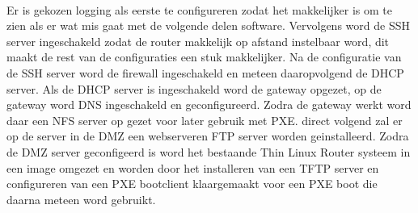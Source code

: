\documentclass[12pt]{article}
\begin{document}
\paragraph{}
Er is gekozen logging als eerste te configureren zodat het makkelijker is om te zien als er wat mis gaat met de volgende delen software. Vervolgens word de SSH server ingeschakeld zodat de router makkelijk op afstand instelbaar word, dit maakt de rest van de configuraties een stuk makkelijker. Na de configuratie van de SSH server word de firewall ingeschakeld en meteen daaropvolgend de DHCP server. Als de DHCP server is ingeschakeld word de gateway opgezet, op de gateway word DNS ingeschakeld en geconfigureerd. Zodra de gateway werkt word daar een NFS server op gezet voor later gebruik met PXE. direct volgend zal er op de server in de DMZ een webserveren FTP server worden geinstalleerd. Zodra de DMZ server geconfigeerd is word het bestaande Thin Linux Router systeem in een image omgezet en worden door het installeren van een TFTP server en configureren van een PXE bootclient klaargemaakt voor een PXE boot die daarna meteen word gebruikt.
\end{document}
